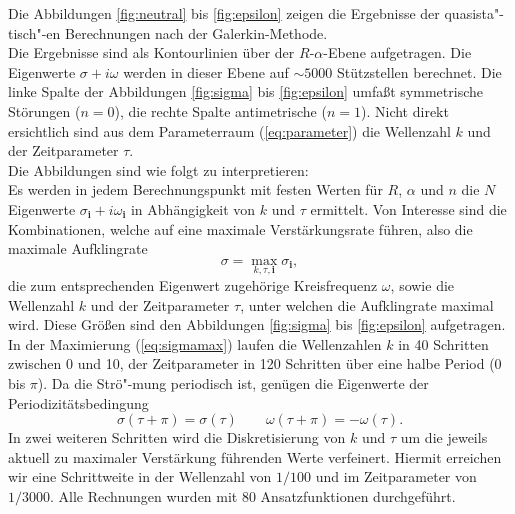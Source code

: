 \documentclass[10pt,a5paper,oneside,draft]{book}
\numberwithin{equation}{chapter}
\begin{document}
Die Abbildungen \ref{fig:neutral} bis \ref{fig:epsilon} zeigen die Ergebnisse der quasista"-tisch"-en Berechnungen nach der Galerkin-Methode.\\
Die Ergebnisse sind als Kontourlinien \"uber der $R$-$\alpha$-Ebene aufgetragen.
Die Eigenwerte $\sigma+i\omega$ werden in dieser Ebene auf $\sim 5000$ St\"utzstellen berechnet.
Die linke Spalte der Abbildungen \ref{fig:sigma} bis \ref{fig:epsilon} umfa\ss t symmetrische St\"orungen ($n=0$), die rechte Spalte antimetrische ($n=1$).
Nicht direkt ersichtlich sind aus dem Parameterraum (\mbox{\ref{eq:parameter}}) die Wellenzahl $k$ und der Zeitparameter $\tau$.\\

Die Abbildungen sind wie folgt zu interpretieren:\\
Es werden in jedem Berechnungspunkt mit festen Werten f\"ur $R$, $\alpha$ und $n$ die $N$ Eigenwerte $\sigma_\mathbf{i}+i\omega_\mathbf{i}$ in Abh\"angigkeit von $k$ und $\tau$ ermittelt.
Von Interesse sind die Kombinationen, welche auf eine maximale Verst\"arkungsrate f\"uhren, also die maximale Aufklingrate
\begin{equation}\label{eq:sigmamax}
	\sigma = \max_{k,\tau,\mathbf{i}} \sigma_\mathbf{i},
\end{equation}
die zum entsprechenden Eigenwert zugeh\"orige Kreisfrequenz $\omega$, sowie die Wellenzahl $k$ und der Zeitparameter $\tau$, unter welchen die Aufklingrate maximal wird.
Diese Gr\"o\ss en sind den Abbildungen \ref{fig:sigma} bis \ref{fig:epsilon} aufgetragen.\\
In der Maximierung (\mbox{\ref{eq:sigmamax}}) laufen die Wellenzahlen $k$ in 40 Schritten zwischen 0 und 10, der Zeitparameter in 120 Schritten \"uber eine halbe Period (0 bis $\pi$).
Da die Str\"o"-mung periodisch ist, gen\"ugen die Eigenwerte der Periodizit\"atsbedingung
\begin{equation}
	\sigma(\tau+\pi) = \sigma(\tau) \qquad \omega(\tau+\pi) = -\omega(\tau).
\end{equation}
In zwei weiteren Schritten wird die Diskretisierung von $k$ und $\tau$ um die jeweils aktuell zu maximaler Verst\"arkung f\"uhrenden Werte verfeinert.
Hiermit erreichen wir eine Schrittweite in der Wellenzahl von $1/100$ und im Zeitparameter von $1/3000$.
Alle Rechnungen wurden mit 80 Ansatzfunktionen durchgef\"uhrt.\\
\end{document}
